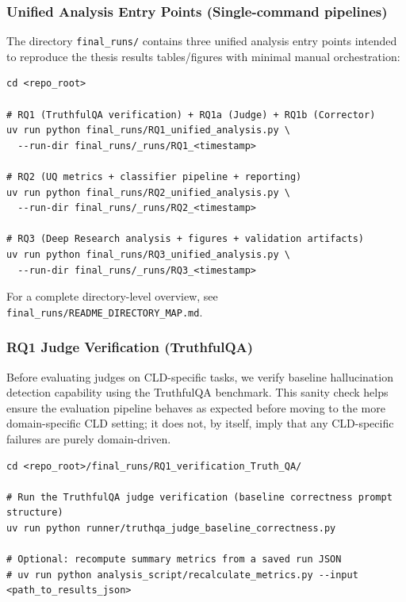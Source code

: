 \subsubsection{Unified Analysis Entry Points (Single-command pipelines)}
\label{sec:unified_entry_points}

The directory \texttt{final\_runs/} contains three unified analysis entry points intended to reproduce the thesis results tables/figures with minimal manual orchestration:
\begin{verbatim}
cd <repo_root>

# RQ1 (TruthfulQA verification) + RQ1a (Judge) + RQ1b (Corrector)
uv run python final_runs/RQ1_unified_analysis.py \
  --run-dir final_runs/_runs/RQ1_<timestamp>

# RQ2 (UQ metrics + classifier pipeline + reporting)
uv run python final_runs/RQ2_unified_analysis.py \
  --run-dir final_runs/_runs/RQ2_<timestamp>

# RQ3 (Deep Research analysis + figures + validation artifacts)
uv run python final_runs/RQ3_unified_analysis.py \
  --run-dir final_runs/_runs/RQ3_<timestamp>
\end{verbatim}

For a complete directory-level overview, see \texttt{final\_runs/README\_DIRECTORY\_MAP.md}.

\subsubsection{RQ1 Judge Verification (TruthfulQA)}
\label{sec:truthqa_verification}

Before evaluating judges on CLD-specific tasks, we verify baseline hallucination detection capability using the TruthfulQA benchmark. This sanity check helps ensure the evaluation pipeline behaves as expected before moving to the more domain-specific CLD setting; it does not, by itself, imply that any CLD-specific failures are purely domain-driven.

\begin{verbatim}
cd <repo_root>/final_runs/RQ1_verification_Truth_QA/

# Run the TruthfulQA judge verification (baseline correctness prompt structure)
uv run python runner/truthqa_judge_baseline_correctness.py

# Optional: recompute summary metrics from a saved run JSON
# uv run python analysis_script/recalculate_metrics.py --input <path_to_results_json>
\end{verbatim}

